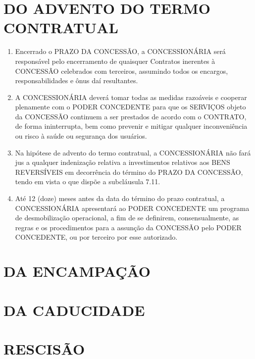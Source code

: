 \documentclass[a4paper,11pt]{report} %
\begin{document}
\section{DO ADVENTO DO TERMO CONTRATUAL}
\label{sec:DEZU}
\begin{enumerate}
\item \label{itm:UFFU} Encerrado o PRAZO DA CONCESSÃO, a CONCESSIONÁRIA será responsável pelo encerramento de quaisquer Contratos inerentes à CONCESSÃO celebrados com terceiros, assumindo todos os encargos, responsabilidades e ônus daí resultantes.

\item \label{itm:8PMK} A CONCESSIONÁRIA deverá tomar todas as medidas razoáveis e cooperar plenamente com o PODER CONCEDENTE para que os SERVIÇOS objeto da CONCESSÃO continuem a ser prestados de acordo com o CONTRATO, de forma ininterrupta, bem como prevenir e mitigar qualquer inconveniência ou risco à saúde ou segurança dos usuários.

\item \label{itm:JD97} Na hipótese de advento do termo contratual, a CONCESSIONÁRIA não fará jus a qualquer indenização relativa a investimentos relativos aos BENS REVERSÍVEIS em decorrência do término do PRAZO DA CONCESSÃO, tendo em vista o que dispõe a subcláusula 7.11.

\item \label{itm:8978} Até 12 (doze) meses antes da data do término do prazo contratual, a CONCESSIONÁRIA apresentará ao PODER CONCEDENTE um programa de desmobilização operacional, a fim de se definirem, consensualmente, as regras e os procedimentos para a assunção da CONCESSÃO pelo PODER CONCEDENTE, ou por terceiro por esse autorizado.
\end{enumerate}

\section{DA ENCAMPAÇÃO}
\label{sec:545J}

\section{DA CADUCIDADE}
\label{sec:GEEC}

\section{RESCISÃO}
\label{sec:4BRU}
\end{document}
